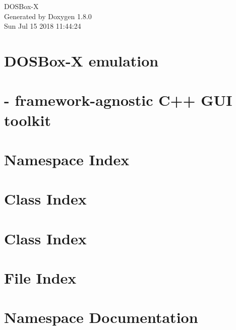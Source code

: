 \documentclass{book}
\begin{document}
\hypersetup{pageanchor=false,citecolor=blue}
\begin{titlepage}
\vspace*{7cm}
\begin{center}
{\Large D\-O\-S\-Box-\/\-X }\\
\vspace*{1cm}
{\large Generated by Doxygen 1.8.0}\\
\vspace*{0.5cm}
{\small Sun Jul 15 2018 11:44:24}\\
\end{center}
\end{titlepage}
\clearemptydoublepage
{}
\tableofcontents
\clearemptydoublepage
{}
\hypersetup{pageanchor=true,citecolor=blue}
\chapter{D\-O\-S\-Box-\/\-X emulation}
\label{index}\hypertarget{index}{}
\chapter{-\/ framework-\/agnostic C++ G\-U\-I toolkit}
\label{gui::tk}
\hypertarget{gui::tk}{}

\chapter{Namespace Index}

\chapter{Class Index}

\chapter{Class Index}

\chapter{File Index}

\chapter{Namespace Documentation}


\end{document}
